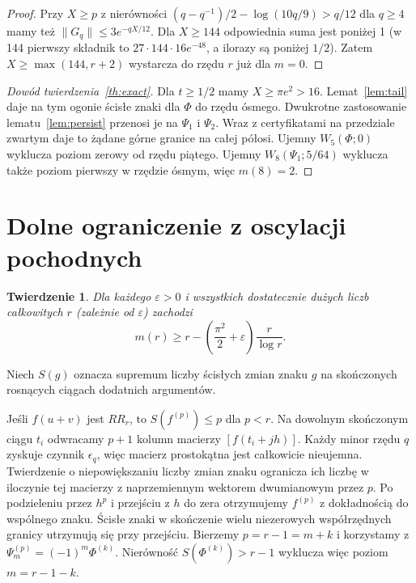 \documentclass[11pt,a4paper,reqno]{amsart}
\newtheorem{theorem}{Twierdzenie}[section]
\numberwithin{equation}{section}
\begin{document}
\begin{proof}
Przy \(X\ge p\) z nierówności \((q-q^{-1})/2-\log(10q/9)>q/12\) dla \(q\ge4\) mamy też \(\|G_q\|\le3e^{-qX/12}\). Dla \(X\ge144\) odpowiednia suma jest poniżej 1 (w 144 pierwszy składnik to \(27\cdot144\cdot16e^{-48}\), a ilorazy są poniżej \(1/2\)). Zatem \(X\ge\max(144,r+2)\) wystarcza do rzędu \(r\) już dla \(m=0\).
\end{proof}


\begin{proof}[Dowód twierdzenia~\ref{th:exact}]
Dla \(t\ge1/2\) mamy \(X\ge\pi e^2>16\). Lemat~\ref{lem:tail} daje na tym ogonie ścisłe znaki dla \(\Phi\) do rzędu ósmego. Dwukrotne zastosowanie lematu~\ref{lem:persist} przenosi je na \(\Psi_1\) i \(\Psi_2\). Wraz z certyfikatami na przedziale zwartym daje to żądane górne granice na całej półosi. Ujemny \(W_5(\Phi;0)\) wyklucza poziom zerowy od rzędu piątego. Ujemny \(W_8(\Psi_1;5/64)\) wyklucza także poziom pierwszy w rzędzie ósmym, więc \(m(8)=2\).
\end{proof}


\section{Dolne ograniczenie z oscylacji pochodnych}\label{sec:lower}


\begin{theorem}\label{th:lower}
Dla każdego \(\varepsilon>0\) i wszystkich dostatecznie dużych liczb całkowitych \(r\) (zależnie od \(\varepsilon\)) zachodzi
\[m(r)\ge r-\left(\frac{\pi^2}{2}+\varepsilon\right)\frac{r}{\log r}.\]
\end{theorem}


Niech \(S(g)\) oznacza supremum liczby ścisłych zmian znaku \(g\) na skończonych rosnących ciągach dodatnich argumentów.

Jeśli \(f(u+v)\) jest \(RR_r\), to \(S(f^{(p)})\le p\) dla \(p<r\). Na dowolnym skończonym ciągu \(t_i\) odwracamy \(p+1\) kolumn macierzy \([f(t_i+jh)]\). Każdy minor rzędu \(q\) zyskuje czynnik \(\epsilon_q\), więc macierz prostokątna jest całkowicie nieujemna. Twierdzenie o niepowiększaniu liczby zmian znaku \cite{ckk} ogranicza ich liczbę w iloczynie tej macierzy z naprzemiennym wektorem dwumianowym przez \(p\). Po podzieleniu przez \(h^p\) i przejściu z \(h\) do zera otrzymujemy \(f^{(p)}\) z dokładnością do wspólnego znaku. Ścisłe znaki w skończenie wielu niezerowych współrzędnych granicy utrzymują się przy przejściu. Bierzemy \(p=r-1=m+k\) i korzystamy z \(\Psi_m^{(p)}=(-1)^m\Phi^{(k)}\). Nierówność \(S(\Phi^{(k)})>r-1\) wyklucza więc poziom \(m=r-1-k\).
\end{document}
